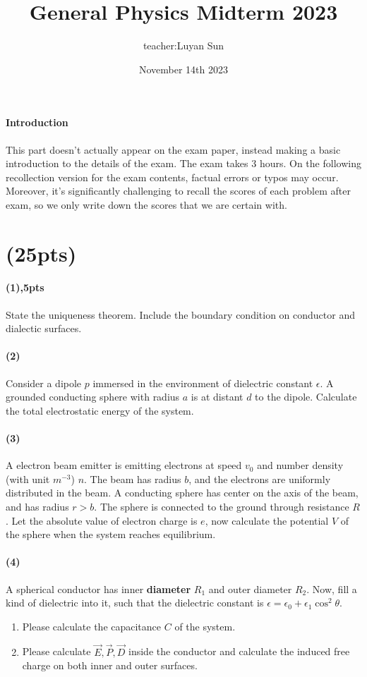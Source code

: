 \documentclass{article}
\title{General Physics Midterm 2023}
\author{teacher:Luyan Sun}
\date{November 14th 2023}
\begin{document}
\maketitle
\paragraph{Introduction}
This part doesn't actually appear on the exam paper, instead making a basic introduction to the details of the exam. The exam takes 3 hours. On the following recollection version for the exam contents, factual errors or typos may occur. Moreover, it's significantly challenging to recall the scores of each problem after exam, so we only write down the scores that we are certain with.
\section{(25pts)}
\paragraph{(1),5pts} State the uniqueness theorem. Include the boundary condition on conductor and dialectic surfaces.
\paragraph{(2)} Consider a dipole $p$ immersed in the environment of dielectric constant $\epsilon$. A grounded conducting sphere with radius $a$ is at distant $d$ to the dipole. Calculate the total electrostatic energy of the system.
\paragraph{(3)} A electron beam emitter is emitting electrons at speed $v_0$ and number density (with unit $m^{-3}$) $n$. The beam has radius $b$, and the electrons are uniformly distributed in the beam. A conducting sphere has center on the axis of the beam, and has radius $r>b$. The sphere is connected to the ground through resistance $R$. Let the absolute value of electron charge is $e$, now calculate the potential $V$ of the sphere when the system reaches equilibrium.
\paragraph{(4)} A spherical conductor has inner \textbf{diameter} $R_1$ and outer diameter $R_2$. Now, fill a kind of dielectric into it, such that the dielectric constant is $\epsilon=\epsilon_0+\epsilon_1 \cos^2\theta$. 
\begin{enumerate}
    \item Please calculate the capacitance $C$ of the system.
    \item Please calculate $\overrightarrow{E},\overrightarrow{P},\overrightarrow{D}$ inside the conductor and calculate the induced free charge on both inner and outer surfaces.
\end{enumerate}
\end{document}
